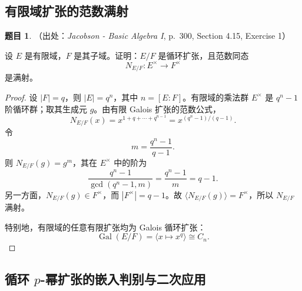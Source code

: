 \documentclass[a4paper]{ctexart}
\theoremstyle{definition}
\newtheorem{example}{题目}[section]
\theoremstyle{analysis}
\theoremstyle{plain}
\begin{document}
\subsection{有限域扩张的范数满射}\label{subsec:problem-finite-field-norm-surjective}

\begin{example}
（出处：\textit{Jacobson - Basic Algebra I}, p.~300, Section 4.15, Exercise 1）

设 \(E\) 是有限域，\(F\) 是其子域。证明：\(E/F\) 是循环扩张，且范数同态
\[
  N_{E/F}\colon E^\times\longrightarrow F^\times
\]
是满射。

\begin{proof}
设 \(|F|=q\)，则 \(|E|=q^n\)，其中 \(n=[E:F]\)。有限域的乘法群 \(E^\times\) 是
\(q^n-1\) 阶循环群；取其生成元 \(g\)。由有限 Galois 扩张的范数公式，
\[
  N_{E/F}(x)=x^{1+q+\cdots+q^{n-1}}
  =x^{(q^n-1)/(q-1)}.
\]
令
\[
  m=\frac{q^n-1}{q-1}.
\]
则 \(N_{E/F}(g)=g^m\)，其在 \(E^\times\) 中的阶为
\[
  \frac{q^n-1}{\gcd(q^n-1,m)}
  =\frac{q^n-1}{m}=q-1.
\]
另一方面，\(N_{E/F}(g)\in F^\times\)，而 \(|F^\times|=q-1\)。故
\(\langle N_{E/F}(g)\rangle=F^\times\)，所以 \(N_{E/F}\) 满射。

特别地，有限域的任意有限扩张均为 Galois 循环扩张：
\[
  \operatorname{Gal}(E/F)
  =\langle x\mapsto x^q\rangle\cong C_n.
\]
\end{proof}
\end{example}

\subsection{\texorpdfstring{循环 \(p\)-幂扩张的嵌入判别与二次应用}{循环 p-幂扩张的嵌入判别与二次应用}}\label{subsec:problem-cyclic-p-power-embedding}
\end{document}
